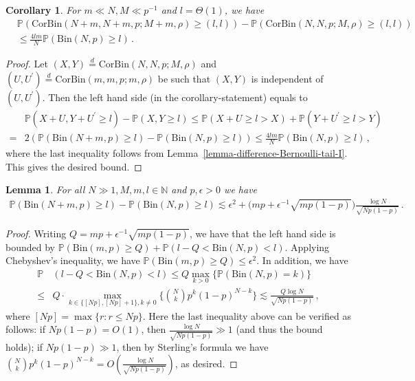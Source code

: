 \documentclass[11pt]{article}
\newtheorem{Lemma}[Theorem]{Lemma}
\newtheorem{Corollary}[Theorem]{Corollary}
\numberwithin{equation}{section}
\begin{document}
\begin{Corollary} \label{corollary-difference-CorBernoulli-tail-I}
For $m \ll N,M \ll p^{-1}$ and $l = \Theta(1)$, we have
\begin{align*}
    & \mathbb{P}( \mathrm{CorBin} (N+m,N+m,p;M+m,\rho) \geq (l,l)) - \mathbb{P}(\mathrm{CorBin}(N,N,p;M,\rho) \geq (l,l) ) \\
    & \leq \frac{4 l m}{N} \mathbb{P} ( \mathrm{Bin}(N,p) \geq l ) \,.
\end{align*}
\end{Corollary}
\begin{proof}
Let $(X,Y) \overset{d}{=} \mathrm{CorBin}(N,N,p;M,\rho)$ and $(U,U^{\prime}) \overset{d}{=} \mathrm{CorBin}(m,m,p;m,\rho)$ be such that $(X, Y)$ is independent of $(U,U^{\prime})$. Then the left hand side (in the corollary-statement) equals to
\begin{align*}
    & \mathbb{P}( X+U, Y+U^{\prime} \geq l ) - \mathbb{P}(X,Y \geq l) \leq \mathbb{P}( X+U \geq l > X ) + \mathbb{P}( Y+U^{\prime} \geq l > Y ) \\
    = & 2 ( \mathbb{P} ( \mathrm{Bin}(N+m,p) \geq l ) - \mathbb{P}( \mathrm{Bin}(N,p) \geq l ) ) \leq \frac{4lm}{N} \mathbb{P}(\mathrm{Bin}(N,p) \geq l)\,,
\end{align*}
where the last inequality follows from Lemma~\ref{lemma-difference-Bernoulli-tail-I}. This gives the desired bound.
\end{proof}

\begin{Lemma} \label{lemma-difference-Bernoulli-tail-II}
For all $N \gg 1,M,m,l \in \mathbb{N}$ and $p,\epsilon>0$ we have
\begin{align*}
     \mathbb{P}(\mathrm{Bin}(N+m,p) \geq l ) - \mathbb{P}( \mathrm{Bin}(N,p) \geq l ) 
    \lesssim \epsilon^{2} + \big( mp + \epsilon^{-1} \sqrt{ mp(1-p) } \big)  \frac{\log N}{\sqrt{Np(1-p)}}   \,.
\end{align*}
\end{Lemma}
\begin{proof}
Writing $Q=mp + \epsilon^{-1}  \sqrt{ mp(1-p) }$, we have that the left hand side is bounded by $\mathbb{P}( \mathrm{Bin}(m,p) \geq Q ) + \mathbb{P}( l-Q < \mathrm{Bin}(N,p) < l )$.
Applying Chebyshev's inequality, we have $\mathbb{P}( \mathrm{Bin}(m,p) \geq Q) \leq \epsilon^2 $. In addition, we have
\begin{align}\label{eq-bound-binomial-difference}
    \mathbb{P}&( l-Q < \mathrm{Bin}(N,p) < l ) \leq Q \max_{k>0} \{ \mathbb{P}( \mathrm{Bin}(N,p) = k ) \} \nonumber \\
    \leq & Q \cdot \max_{k \in \{ [Np], [Np]+1 \}, k \neq 0} \Big\{  \binom{ N }{ k } p^{k} (1-p)^{N-k}  \Big\} \lesssim \frac{Q \log N}{\sqrt{Np(1-p)}}\,,   
\end{align}
where $[Np] = \max\{ r : r \leq Np\}$. Here the last inequality above can be verified as follows: if $Np(1-p)= O(1)$, then $\frac{\log N}{\sqrt{Np(1-p)}} \gg 1$ (and thus the bound holds); if $Np(1-p) \gg 1$, then by Sterling's formula we have $\binom{N}{k} p^{k} (1-p)^{N-k} = O( \frac{\log N}{\sqrt{Np(1-p)}} )$, as desired.
\end{proof}
\end{document}
